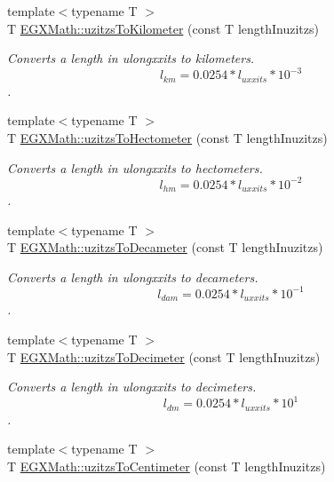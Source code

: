 \begin{DoxyCompactItemize}
{\footnotesize template$<$typename T $>$ }\\T \mbox{\hyperlink{group___e_g_x_math-_conversions-_length_conversions-_imperial-uzitzs-_s_i_ga43a39eb66f3250c955de8fb2beff314c}{E\+G\+X\+Math\+::uzitzs\+To\+Kilometer}} (const T length\+Inuzitzs)
\begin{DoxyCompactList}\small\item\em Converts a length in ulongxxits to kilometers. \[ l_{km}=0.0254 * l_{uxxits} * 10^{-3} \]. \end{DoxyCompactList}\item 
{\footnotesize template$<$typename T $>$ }\\T \mbox{\hyperlink{group___e_g_x_math-_conversions-_length_conversions-_imperial-uzitzs-_s_i_gabc1973b8ea47e021bd981f94ac1f254d}{E\+G\+X\+Math\+::uzitzs\+To\+Hectometer}} (const T length\+Inuzitzs)
\begin{DoxyCompactList}\small\item\em Converts a length in ulongxxits to hectometers. \[ l_{hm}=0.0254 * l_{uxxits} * 10^{-2} \]. \end{DoxyCompactList}\item 
{\footnotesize template$<$typename T $>$ }\\T \mbox{\hyperlink{group___e_g_x_math-_conversions-_length_conversions-_imperial-uzitzs-_s_i_ga62dcf7a675d92ce74d56e67f2fed7ace}{E\+G\+X\+Math\+::uzitzs\+To\+Decameter}} (const T length\+Inuzitzs)
\begin{DoxyCompactList}\small\item\em Converts a length in ulongxxits to decameters. \[ l_{dam}=0.0254 * l_{uxxits} * 10^{-1} \]. \end{DoxyCompactList}\item 
{\footnotesize template$<$typename T $>$ }\\T \mbox{\hyperlink{group___e_g_x_math-_conversions-_length_conversions-_imperial-uzitzs-_s_i_ga178324834750df4df1026a8900fadbcc}{E\+G\+X\+Math\+::uzitzs\+To\+Decimeter}} (const T length\+Inuzitzs)
\begin{DoxyCompactList}\small\item\em Converts a length in ulongxxits to decimeters. \[ l_{dm}=0.0254 * l_{uxxits} * 10^{1} \]. \end{DoxyCompactList}\item 
{\footnotesize template$<$typename T $>$ }\\T \mbox{\hyperlink{group___e_g_x_math-_conversions-_length_conversions-_imperial-uzitzs-_s_i_ga1fb15b72a000d43348190004a49ed7bc}{E\+G\+X\+Math\+::uzitzs\+To\+Centimeter}} (const T length\+Inuzitzs)

\end{DoxyCompactItemize}
